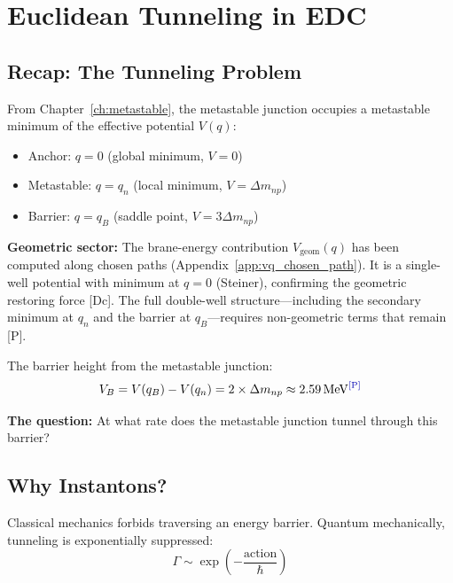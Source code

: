 \section{Euclidean Tunneling in EDC}
\label{sec:instanton:setup}

\subsection{Recap: The Tunneling Problem}

From Chapter~\ref{ch:metastable}, the metastable junction occupies a metastable minimum of
the effective potential $V(q)$:
\begin{itemize}
    \item Anchor: $q = 0$ (global minimum, $V = 0$)
    \item Metastable: $q = q_n$ (local minimum, $V = \Delta m_{np}$) \tagP
    \item Barrier: $q = q_B$ (saddle point, $V = 3\Delta m_{np}$) \tagP
\end{itemize}

\textbf{Geometric sector:} The brane-energy contribution
$V_{\mathrm{geom}}(q)$ has been computed along chosen paths
(Appendix~\ref{app:vq_chosen_path}). It is a single-well potential
with minimum at $q = 0$ (Steiner), confirming the geometric restoring
force [Dc]. The full double-well structure---including the secondary
minimum at $q_n$ and the barrier at $q_B$---requires non-geometric terms
that remain [P].

The barrier height from the metastable junction:
\begin{equation}
    \VB = V(q_B) - V(q_n) = 2 \times \Delta m_{np} \approx 2.59 \MeV \tagP
    \label{eq:VB_recall}
\end{equation}

\textbf{The question:} At what rate does the metastable junction tunnel through this barrier?

\subsection{Why Instantons?}

Classical mechanics forbids traversing an energy barrier. Quantum mechanically,
tunneling is exponentially suppressed:
\begin{equation}
    \Gamma \sim \exp\left(-\frac{\text{action}}{\hbar}\right)
\end{equation}

